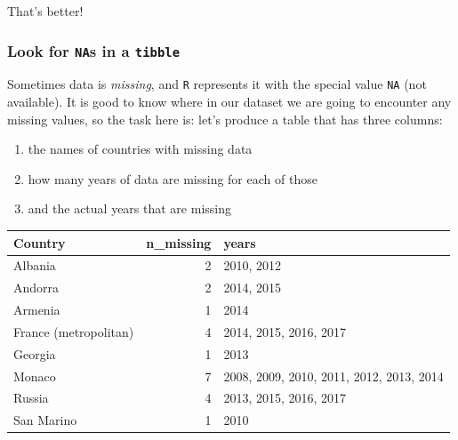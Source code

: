 \documentclass[]{book}
\newenvironment{Shaded}{\begin{snugshade}}{\end{snugshade}}
\newcommand{\KeywordTok}[1]{\textcolor[rgb]{0.13,0.29,0.53}{\textbf{#1}}}
\newcommand{\DataTypeTok}[1]{\textcolor[rgb]{0.13,0.29,0.53}{#1}}
\newcommand{\StringTok}[1]{\textcolor[rgb]{0.31,0.60,0.02}{#1}}
\newcommand{\CommentTok}[1]{\textcolor[rgb]{0.56,0.35,0.01}{\textit{#1}}}
\newcommand{\OperatorTok}[1]{\textcolor[rgb]{0.81,0.36,0.00}{\textbf{#1}}}
\newcommand{\NormalTok}[1]{#1}
\providecommand{\tightlist}{%
  \setlength{\itemsep}{0pt}\setlength{\parskip}{0pt}}
\theoremstyle{definition}
\theoremstyle{definition}
\theoremstyle{definition}
\theoremstyle{remark}
\begin{document}
That's better!

\subsubsection*{\texorpdfstring{Look for \texttt{NA}s in a
\texttt{tibble}}{Look for NAs in a tibble}}\label{look-for-nas-in-a-tibble}

Sometimes data is \emph{missing}, and \texttt{R} represents it with the
special value \texttt{NA} (not available). It is good to know where in
our dataset we are going to encounter any missing values, so the task
here is: let's produce a table that has three columns:

\begin{enumerate}
\def\labelenumi{\arabic{enumi}.}
\tightlist
\item
  the names of countries with missing data
\item
  how many years of data are missing for each of those
\item
  and the actual years that are missing
\end{enumerate}

\begin{Shaded}
\end{Shaded}

\begin{tabular}{l|r|l}
\hline
Country & n\_missing & years\\
\hline
Albania & 2 & 2010, 2012\\
\hline
Andorra & 2 & 2014, 2015\\
\hline
Armenia & 1 & 2014\\
\hline
France (metropolitan) & 4 & 2014, 2015, 2016, 2017\\
\hline
Georgia & 1 & 2013\\
\hline
Monaco & 7 & 2008, 2009, 2010, 2011, 2012, 2013, 2014\\
\hline
Russia & 4 & 2013, 2015, 2016, 2017\\
\hline
San Marino & 1 & 2010\\
\hline
\end{tabular}
\end{document}
